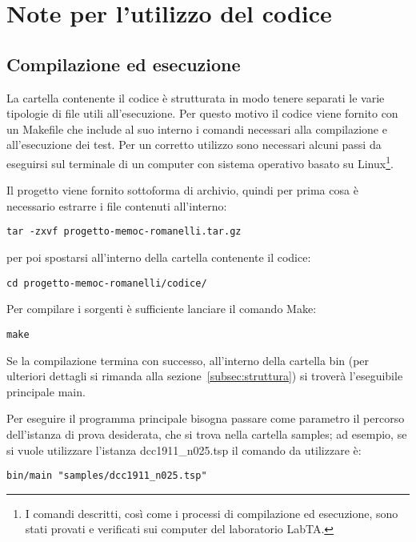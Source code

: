 
\section{Note per l'utilizzo del codice}\label{sec:codice}
\subsection{Compilazione ed esecuzione}\label{subsec:utilizzo}
La cartella contenente il codice è strutturata in modo tenere separati le varie tipologie di file utili all'esecuzione.
Per questo motivo il codice viene fornito con un \textsf{Makefile} che include al suo interno i comandi
necessari alla compilazione e all'esecuzione dei test.
Per un corretto utilizzo sono necessari alcuni passi da eseguirsi sul terminale di un computer con sistema
operativo basato su Linux\footnote{I comandi descritti, così come i processi di compilazione ed esecuzione,
sono stati provati e verificati sui computer del laboratorio LabTA.}.

Il progetto viene fornito sottoforma di archivio, quindi per prima cosa è necessario estrarre i file contenuti all'interno:
\label{lst:make-passo-1}
\begin{lstlisting}[style=BashStyle]
tar -zxvf progetto-memoc-romanelli.tar.gz
\end{lstlisting}
per poi spostarsi all'interno della cartella contenente il codice:
\label{lst:make-passo-2}
\begin{lstlisting}[style=BashStyle]
cd progetto-memoc-romanelli/codice/
\end{lstlisting}
%
Per compilare i sorgenti è sufficiente lanciare il comando \textsf{Make}:
\label{lst:make-passo-3}
\begin{lstlisting}[style=BashStyle]
make
\end{lstlisting}
%
Se la compilazione termina con successo, all'interno della cartella \textsf{bin}
(per ulteriori dettagli si rimanda alla sezione~\ref{subsec:struttura}) si troverà l'eseguibile principale \textsf{main}.

Per eseguire il programma principale bisogna passare come parametro
il percorso dell'istanza di prova desiderata, che si trova nella cartella \textsf{samples};
ad esempio, se si vuole utilizzare l'istanza \textsf{dcc1911\_n025.tsp} il comando da utilizzare è:
\label{lst:make-passo-4}
\begin{lstlisting}[style=BashStyle]
bin/main "samples/dcc1911_n025.tsp"
\end{lstlisting}
%
